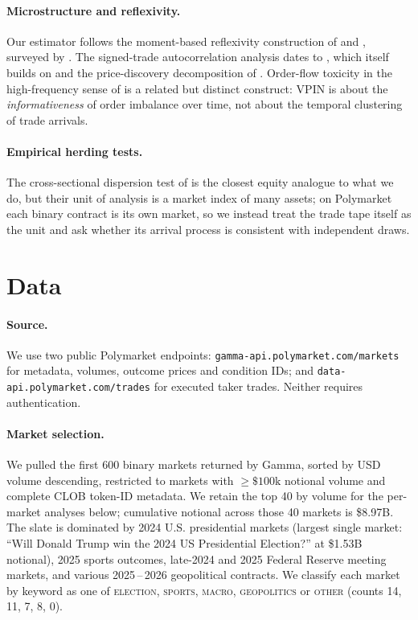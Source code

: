\documentclass{article}
\begin{document}
\paragraph{Microstructure and reflexivity.} Our estimator follows the
moment-based reflexivity construction of \citet{filimonov2012quantifying}
and \citet{hardiman2013critical}, surveyed by \citet{bacry2015hawkes}.
The signed-trade autocorrelation analysis dates to
\citet{bouchaud2004fluctuations}, which itself builds on
\citet{kyle1985continuous} and the price-discovery decomposition of
\citet{hasbrouck1995one}. Order-flow toxicity in the high-frequency
sense of \citet{easley2012flow} is a related but distinct construct: VPIN
is about the \emph{informativeness} of order imbalance over time, not
about the temporal clustering of trade arrivals.

\paragraph{Empirical herding tests.} The cross-sectional dispersion
test of \citet{chang2000examination} is the closest equity analogue to
what we do, but their unit of analysis is a market index of many assets;
on Polymarket each binary contract is its own market, so we instead
treat the trade tape itself as the unit and ask whether its arrival
process is consistent with independent draws.

\section{Data}\label{sec:data}

\paragraph{Source.} We use two public Polymarket endpoints:
\texttt{gamma-api.polymarket.com/markets} for metadata, volumes, outcome
prices and condition IDs; and \texttt{data-api.polymarket.com/trades} for
executed taker trades. Neither requires authentication.

\paragraph{Market selection.} We pulled the first 600 binary markets
returned by Gamma, sorted by USD volume descending, restricted to
markets with $\geq\$100\text{k}$ notional volume and complete CLOB
token-ID metadata. We retain the top 40 by volume for the per-market
analyses below; cumulative notional across those 40 markets is
\$8.97B. The slate is dominated by 2024 U.S. presidential markets
(largest single market: ``Will Donald Trump win the 2024 US Presidential
Election?'' at \$1.53B notional), 2025 sports outcomes, late-2024 and
2025 Federal Reserve meeting markets, and various 2025\,--\,2026
geopolitical contracts. We classify each market by keyword as one of
\textsc{election}, \textsc{sports}, \textsc{macro}, \textsc{geopolitics}
or \textsc{other} (counts 14, 11, 7, 8, 0).
\end{document}
